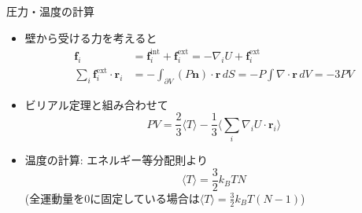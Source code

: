 
\begin{frame}[t,fragile]{圧力・温度の計算}
  \begin{itemize}
  \item 壁から受ける力を考えると
    \begin{align*}
      \mathbf{f}_i &= \mathbf{f}_i^\text{int} + \mathbf{f}_i^\text{ext} = -\nabla_i U + \mathbf{f}_i^\text{ext} \\
      \sum_i \mathbf{f}_i^\text{ext} \cdot \mathbf{r}_i &= - \int_{\partial V} (P \mathbf{n}) \cdot \mathbf{r} \, dS = - P \int \nabla \cdot \mathbf{r} \, dV = -3PV
    \end{align*}
  \item ビリアル定理と組み合わせて
    \[
    PV = \frac{2}{3} \langle T \rangle -\frac{1}{3} \langle \sum_i \nabla_i U \cdot \mathbf{r}_i \rangle
    \]
  \item 温度の計算: エネルギー等分配則より
    \[
    \langle T \rangle = \frac{3}{2} k_B T N
    \]
    (全運動量を0に固定している場合は$\langle T \rangle = \frac{3}{2} k_B T (N-1)$)
  \end{itemize}
\end{frame}

